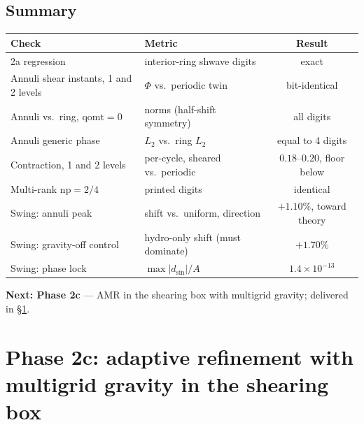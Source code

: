 \documentclass[11pt]{article}
\begin{document}
\subsection{Summary}
\begin{center}
\small
\begin{tabular}{@{}llc@{}}
\toprule
Check & Metric & Result \\
\midrule
2a regression & interior-ring shwave digits & exact \\
Annuli shear instants, 1 and 2 levels & $\Phi$ vs.\ periodic twin & bit-identical \\
Annuli vs.\ ring, $\mathrm{qomt}=0$ & norms (half-shift symmetry) & all digits \\
Annuli generic phase & $L_2$ vs.\ ring $L_2$ & equal to 4 digits \\
Contraction, 1 and 2 levels & per-cycle, sheared vs.\ periodic & $0.18$--$0.20$, floor below \\
Multi-rank $\mathrm{np}=2/4$ & printed digits & identical \\
Swing: annuli peak & shift vs.\ uniform, direction & $+1.10\%$, toward theory \\
Swing: gravity-off control & hydro-only shift (must dominate) & $+1.70\%$ \\
Swing: phase lock & $\max|d_{\sin}|/A$ & $1.4\times10^{-13}$ \\
\bottomrule
\end{tabular}
\end{center}

\noindent\textbf{Next: Phase 2c} --- AMR in the shearing box with multigrid
gravity; delivered in \S\ref{sec:phase2c}.

\section{Phase 2c: adaptive refinement with multigrid gravity in the shearing box}
\label{sec:phase2c}
\end{document}
